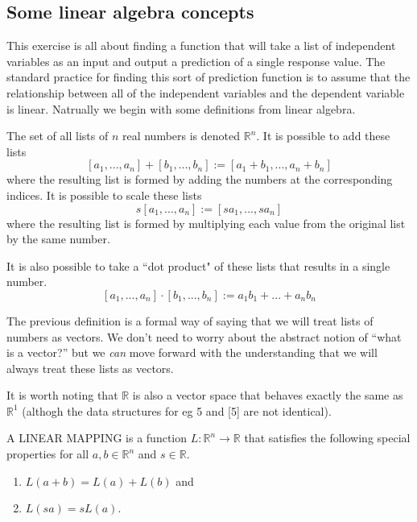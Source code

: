 \subsection{Some linear algebra concepts}

This exercise is all about finding a function that will take a list of independent variables as an input and output a prediction of a single response value. The standard practice for finding this sort of prediction function is to assume that the relationship between all of the independent variables and the dependent variable is linear. Natrually we begin with some definitions from linear algebra.

\begin{definition}[$\mathbb{R}^n$]

	The set of all lists of $n$ real numbers is denoted $\mathbb{R}^n$. It is possible to add these lists
	$$[a_1,...,a_n]+[b_1,...,b_n]:=[a_1+b_1,...,a_n+b_n]$$
	where the resulting list is formed by adding the numbers at the corresponding indices. It is possible to scale these lists
	$$s[a_1,...,a_n]:=[sa_1,...,sa_n]$$
	where the resulting list is formed by multiplying each value from the original list by the same number.

	It is also possible to take a ``dot product" of these lists that results in a single number.
	$$[a_1,...,a_n]\cdot[b_1,...,b_n]:=a_1b_1+...+a_nb_n$$
\end{definition}

The previous definition is a formal way of saying that we will treat lists of numbers as vectors. We don't need to worry about the abstract notion of ``what is a vector?'' but we \emph{can} move forward with the understanding that we will always treat these lists as vectors.

It is worth noting that $\mathbb{R}$ is also a vector space that behaves exactly the same as $\mathbb{R}^1$ (althogh the data structures for eg 5 and [5] are not identical).

\begin{definition}

A LINEAR MAPPING is a function $L:\mathbb{R}^n\to\mathbb{R}$ that satisfies the following special properties for all $a,b\in\mathbb{R}^n$ and $s\in\mathbb{R}$.
\begin{enumerate}
	\item $L(a+b)=L(a)+L(b)$ and
	\item $L(sa)=sL(a)$.
\end{enumerate}
\end{definition}

